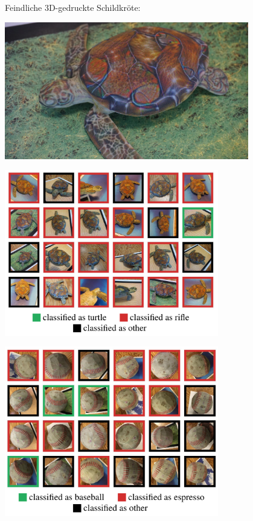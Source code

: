 \documentclass[aspectratio=169,x11names]{beamer}
\begin{document}
\begin{frame}

\begin{center}
Feindliche 3D-gedruckte Schildkröte:
\end{center}

\begin{center}
\includegraphics[width=0.8\textwidth]{images/rifle_turtle.jpg} 
\end{center}
\end{frame}

\begin{frame}
\begin{center}
\includegraphics[width=0.7\textwidth]{images/turtle_class} 
\end{center}
\end{frame}

\begin{frame}
\begin{center}
\includegraphics[width=0.7\textwidth]{images/baseball_class} 
\end{center}
\end{frame}
\end{document}
